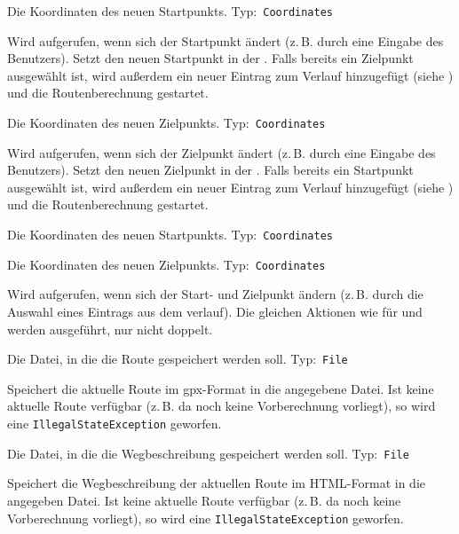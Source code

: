 \documentclass[a4paper, 11pt]{article}
\makeatletter
\def\namedlabel#1#2{\begingroup
    #2%
    \def\@currentlabel{#2}%
    \phantomsection\label{#1}\endgroup
}
\newcommand{\currentmethod}[0]{#1}
\let\currentmethod=\undefined
\newcommand{\param}[3]{
  \item[\namedlabel{P:\currentclass.\currentmethod.#1}{\code{#1}}] #3 Typ:~\code{#2}
}
\newcommand{\code}[1]{\texttt{#1}}
\makeatother
\begin{document}
{{          
                 {
                   \param{start}{Coordinates}{Die Koordinaten des neuen Startpunkts.}
                 }
                 {
                   Wird aufgerufen, wenn sich der Startpunkt ändert (z.\,B. durch eine Eingabe des Benutzers).
                   Setzt den neuen Startpunkt in der .
                   Falls bereits ein Zielpunkt ausgewählt ist, wird außerdem ein neuer Eintrag zum Verlauf hinzugefügt (siehe ) und die Routenberechnung gestartet.
                 }
                 {
                   \param{destination}{Coordinates}{Die Koordinaten des neuen Zielpunkts.}
                 }
                 {
                   Wird aufgerufen, wenn sich der Zielpunkt ändert (z.\,B. durch eine Eingabe des Benutzers).
                   Setzt den neuen Zielpunkt in der .
                   Falls bereits ein Startpunkt ausgewählt ist, wird außerdem ein neuer Eintrag zum Verlauf hinzugefügt (siehe ) und die Routenberechnung gestartet.
                 }
                 {
                   \param{start}{Coordinates}{Die Koordinaten des neuen Startpunkts.}
                   \param{destination}{Coordinates}{Die Koordinaten des neuen Zielpunkts.}
                 }
                 {
                   Wird aufgerufen, wenn sich der Start- und Zielpunkt ändern (z.\,B. durch die Auswahl eines Eintrags aus dem \gls{verlauf}).
                   Die gleichen Aktionen wie für  und  werden ausgeführt, nur nicht doppelt.
                 }
                 
                 {
                   \param{target}{File}{Die Datei, in die die Route gespeichert werden soll.}
                 }
                 {
                   Speichert die aktuelle Route im \gls{gpx}-Format in die angegebene Datei.
                   Ist keine aktuelle Route verfügbar (z.\,B. da noch keine Vorberechnung vorliegt), so wird eine \code{IllegalStateException} geworfen.
                 }
                 {
                   \param{target}{File}{Die Datei, in die die Wegbeschreibung gespeichert werden soll.}
                 }
                 {
                   Speichert die Wegbeschreibung der aktuellen Route im HTML-Format in die angegeben Datei.
                   Ist keine aktuelle Route verfügbar (z.\,B. da noch keine Vorberechnung vorliegt), so wird eine \code{IllegalStateException} geworfen.
                 }
                 
}}
\end{document}
